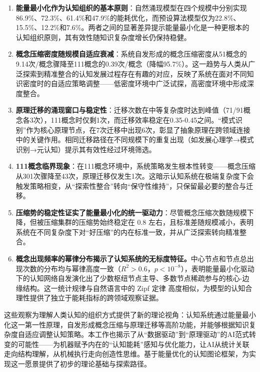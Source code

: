 \documentclass[12pt,a4paper]{article}
\begin{document}
\begin{enumerate}
\item \textbf{能量最小化作为认知组织的基本原则}：自然涌现模型在四个规模中分别实现86.9\%、72.3\%、61.4\%和47.9\%的能耗优化，而预设算法模型仅为22.8\%、15.5\%、12.2\%和7.6\%。两者之间的显著差异提示能量最小化是一种更根本的认知组织原则，其有效性随知识复杂度增长仍保持稳健。

\item \textbf{概念压缩密度随规模自适应衰减}：系统自发形成的概念压缩密度从51概念的9.14次/概念骤降至111概念的0.39次/概念（降幅95.7\%）。这一趋势与人类从广泛探索到精准整合的认知发展过程存在有趣的对应，反映了系统在面对不同知识密度时的自适应策略调整——低密度环境中广泛试探，高密度环境中形成深度整合。

\item \textbf{原理迁移的涌现窗口与稳定性}：迁移次数在中等复杂度时达到峰值（71/91概念各3次），111概念时仅剩1次，而迁移效率稳定在0.35-0.45之间。“模式识别”作为核心原理节点，在7次迁移中出现6次，彰显了抽象原理在跨领域连接中的关键作用。相同迁移路径在不同规模下的重复出现（如发展心理学→模式识别→元认知）提示其有效性经过环境筛选。

\item \textbf{111概念临界现象}：在111概念环境中，系统策略发生根本性转变——概念压缩从301次骤降至43次，原理迁移仅发生1次。这暗示认知系统在极端复杂度下会触发策略相变，从“探索性整合”转向“保守性维持”，只保留最必要的整合与迁移。

\item \textbf{压缩势的稳定性证实了能量最小化的统一驱动力}：尽管概念压缩次数随规模下降，但被压缩集群的压缩势始终稳定在 0.8 左右，且标准差随规模减小，表明系统在不同复杂度下对“好压缩”的内在标准一致，并从广泛探索转向精准整合。

\item \textbf{概念出现频率的幂律分布揭示了认知系统的无标度特征。}中心节点和节点总出现次数的分布均与幂律高度一致（$R^2>0.6$，$p<10^{-8}$），表明能量最小化驱动下的认知网络自发演化出了少数枢纽节点主导、多数节点稀疏参与的核心-边缘结构。这一统计规律与自然语言中的 Zipf 定律 \citep{zipf1949human} 高度相似，为模型的认知合理性提供了独立于能耗指标的跨领域观察证据。

\end{enumerate}

这些观察为理解人类认知的组织方式提供了新的理论视角：认知系统通过能量最小化这一第一性原理，自发形成概念压缩与原理迁移等高阶功能，并能够根据知识复杂度自适应调整认知策略。本工作也揭示了从“数据驱动”到“原理驱动”的AI范式转变的可能性——为机器赋予内在的“认知能耗”感知与优化能力，让AI从统计关联走向结构理解，从机械执行走向创造性思维。基于能量优化的认知图论框架，为实现这一愿景提供了初步的理论基础与探索路径。
\end{document}
